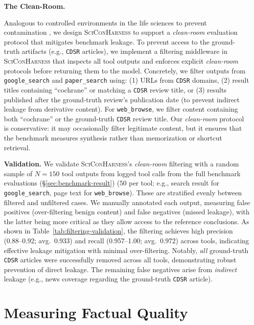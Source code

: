 \documentclass{article}
\newcommand{\xhdr}[1]{%
  \noindent\textbf{#1.}
}
\begin{document}
\xhdr{The Clean-Room}
Analogous to controlled environments in the life sciences to prevent contamination \cite{achengineering_biotech_cleanroom}, we design \textsc{SciConHarness} to support a \textit{clean-room} evaluation protocol that mitigates benchmark leakage. To prevent access to the ground-truth artifacts (e.g., \texttt{CDSR} articles), we implement a filtering middleware in \textsc{SciConHarness} that inspects all tool outputs and enforces explicit \textit{clean-room} protocols before returning them to the model. Concretely, we filter outputs from \texttt{google\_search} and \texttt{paper\_search} using: (1) URLs from \texttt{CDSR} domains, (2) result titles containing ``cochrane'' or matching a \texttt{CDSR} review title, or (3) results published after the ground-truth review's publication date (to prevent indirect leakage from derivative content).
For \texttt{web\_browse}, we filter content containing both ``cochrane'' or the ground-truth \texttt{CDSR} review title. Our \textit{clean-room} protocol is conservative: it may occasionally filter legitimate content, but it ensures that the benchmark measures synthesis rather than memorization or shortcut retrieval.

\xhdr{Validation} We validate \textsc{SciConHarness}'s \textit{clean-room} filtering with a random sample of $N{=}150$ tool outputs from logged tool calls from the full benchmark evaluations (\S\ref{sec:benchmark-result})
($50$ per tool; e.g., search result for \texttt{google\_search}, page text for \texttt{web\_browse}). These are stratified evenly between filtered and unfiltered cases.
We manually annotated each output, measuring false positives (over-filtering benign content) and false negatives (missed leakage), with the latter being more critical as they allow access to the reference conclusions. As shown in Table~\ref{tab:filtering-validation}, the filtering achieves high precision (0.88--0.92; avg.\ 0.933) and recall (0.957--1.00; avg.\ 0.972) across tools, indicating effective leakage mitigation with minimal over-filtering. Notably, \textit{all} ground-truth \texttt{CDSR} articles were successfully removed across all tools, demonstrating robust prevention of direct leakage. The remaining false negatives arise from \textit{indirect} leakage (e.g., news coverage regarding the ground-truth \texttt{CDSR} article).






\section{Measuring Factual Quality}\label{sec:metrics}
\end{document}

